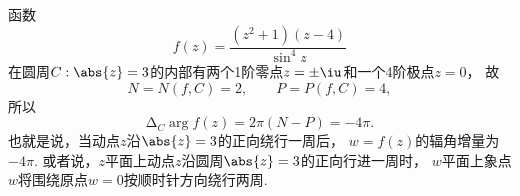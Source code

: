 \begin{example}
函数\begin{equation*}
	f(z) = \frac{(z^2+1)(z-4)}{\sin^4 z}
\end{equation*}
在圆周\(C: \abs{z}=3\)的内部有两个1阶零点\(z=\pm\iu\)和一个4阶极点\(z=0\)，
故\begin{equation*}
	N=N(f,C)=2, \qquad P=P(f,C)=4,
\end{equation*}
所以\begin{equation*}
	\increment_C \arg f(z) = 2\pi(N - P) = -4\pi.
\end{equation*}
也就是说，当动点\(z\)沿\(\abs{z}=3\)的正向绕行一周后，
\(w = f(z)\)的辐角增量为\(-4\pi\).
或者说，\(z\)平面上动点\(z\)沿圆周\(\abs{z}=3\)的正向行进一周时，
\(w\)平面上象点\(w\)将围绕原点\(w=0\)按顺时针方向绕行两周.
\end{example}

